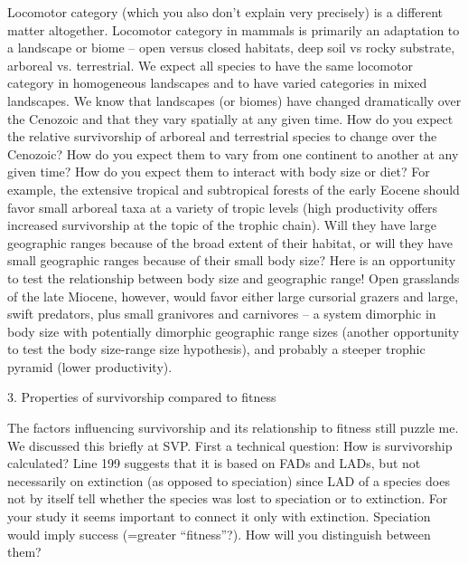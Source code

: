 \documentclass{article}
\begin{document}
Locomotor category (which you also don’t explain very precisely) is a different matter altogether.  Locomotor category in mammals is primarily an adaptation to a landscape or biome – open versus closed habitats, deep soil vs rocky substrate, arboreal vs. terrestrial.  We expect all species to have the same locomotor category in homogeneous landscapes and to have varied categories in mixed landscapes.  We know that landscapes (or biomes) have changed dramatically over the Cenozoic and that they vary spatially at any given time.  How do you expect the relative survivorship of arboreal and terrestrial species to change over the Cenozoic?  How do you expect them to vary from one continent to another at any given time?  How do you expect them to interact with body size or diet?  For example, the extensive tropical and subtropical forests of the early Eocene should favor small arboreal taxa at a variety of tropic levels (high productivity offers increased survivorship at the topic of the trophic chain).  Will they have large geographic ranges because of the broad extent of their habitat, or will they have small geographic ranges because of their small body size?   Here is an opportunity to test the relationship between body size and geographic range!  Open grasslands of the late Miocene, however, would favor either large cursorial grazers and large, swift predators, plus small granivores and carnivores – a system dimorphic in body size with potentially dimorphic geographic range sizes (another opportunity to test the body size-range size hypothesis), and probably a steeper trophic pyramid (lower productivity). 

3. Properties of survivorship compared to fitness

The factors influencing survivorship and its relationship to fitness still puzzle me.  We discussed this briefly at SVP.   First a technical question:  How is survivorship calculated?  Line 199 suggests that it is based on FADs and LADs, but not necessarily on extinction (as opposed to speciation) since LAD of a species does not by itself tell whether the species was lost to speciation or to extinction.  For your study it seems important to connect it only with extinction.  Speciation would imply success (=greater “fitness”?).  How will you distinguish between them?
\end{document}
